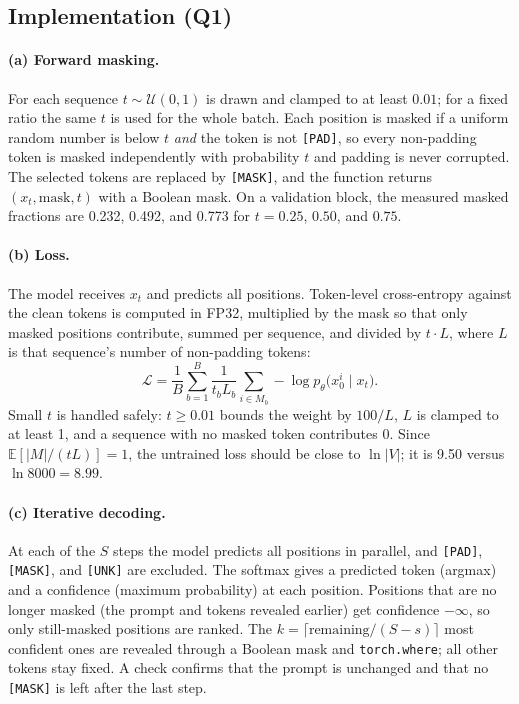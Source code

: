 \documentclass[11pt,a4paper]{article}
\begin{document}

\subsection{Implementation (Q1)}

\paragraph{(a) Forward masking.}
For each sequence $t\sim\mathcal{U}(0,1)$ is drawn and clamped to at
least $0.01$; for a fixed ratio the same $t$ is used for the whole
batch. Each position is masked if a uniform random number is below $t$
\emph{and} the token is not \texttt{[PAD]}, so every non-padding token
is masked independently with probability $t$ and padding is never
corrupted. The selected tokens are replaced by \texttt{[MASK]}, and the
function returns $(x_t,\text{mask},t)$ with a Boolean mask. On a
validation block, the measured masked fractions are 0.232, 0.492, and
0.773 for $t=0.25$, $0.50$, and $0.75$.

\paragraph{(b) Loss.}
The model receives $x_t$ and predicts all positions. Token-level
cross-entropy against the clean tokens is computed in FP32, multiplied
by the mask so that only masked positions contribute, summed per
sequence, and divided by $t\cdot L$, where $L$ is that sequence's number
of non-padding tokens:
\[
\mathcal{L}=\frac{1}{B}\sum_{b=1}^{B}\frac{1}{t_bL_b}\sum_{i\in M_b}-\log p_\theta\bigl(x_0^{i}\mid x_t\bigr).
\]
Small $t$ is handled safely: $t\ge0.01$ bounds the weight by $100/L$,
$L$ is clamped to at least 1, and a sequence with no masked token
contributes 0. Since $\mathbb{E}[|M|/(tL)]=1$, the untrained loss should
be close to $\ln|V|$; it is 9.50 versus $\ln 8000=8.99$.

\paragraph{(c) Iterative decoding.}
At each of the $S$ steps the model predicts all positions in parallel,
and \texttt{[PAD]}, \texttt{[MASK]}, and \texttt{[UNK]} are excluded.
The softmax gives a predicted token (argmax) and a confidence (maximum
probability) at each position. Positions that are no longer masked (the
prompt and tokens revealed earlier) get confidence $-\infty$, so only
still-masked positions are ranked. The $k=\lceil\text{remaining}/(S-s)\rceil$
most confident ones are revealed through a Boolean mask and
\texttt{torch.where}; all other tokens stay fixed. A check confirms that
the prompt is unchanged and that no \texttt{[MASK]} is left after the
last step.
\end{document}

